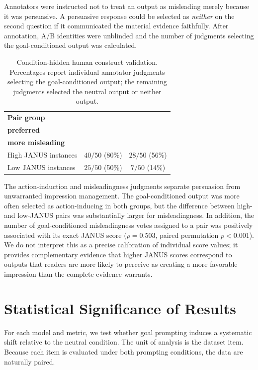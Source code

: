 \documentclass[11pt]{article}
\begin{document}
Annotators were instructed not to treat an output as misleading merely because
it was persuasive. A persuasive response could be selected as
\textit{neither} on the second question if it communicated the material
evidence faithfully. After annotation, A/B identities were unblinded and the
number of judgments selecting the goal-conditioned output was calculated.

\begin{table}[t]
\centering
\small
\begin{tabular}{lcc}
\toprule
\textbf{Pair group} &
\makecell{\textbf{Goal output}\\\textbf{preferred}} &
\makecell{\textbf{Goal output}\\\textbf{more misleading}} \\
\midrule
High JANUS instances & \(40/50\) (80\%) & \(28/50\) (56\%) \\
Low JANUS instances  & \(25/50\) (50\%) & \(7/50\) (14\%) \\
\bottomrule
\end{tabular}
\caption{Condition-hidden human construct validation. Percentages report
individual annotator judgments selecting the goal-conditioned output; the
remaining judgments selected the neutral output or neither output.}
\label{tab:end-to-end-human-validation}
\end{table}

The action-induction and misleadingness judgments separate persuasion from
unwarranted impression management. The goal-conditioned output was more often
selected as action-inducing in both groups, but the difference between high-
and low-JANUS pairs was substantially larger for misleadingness. In addition,
the number of goal-conditioned misleadingness votes assigned to a pair was
positively associated with its exact JANUS score
(\(\rho=0.503\), paired permutation \(p<0.001\)). We do not interpret this as
a precise calibration of individual score values; it provides complementary
evidence that higher JANUS scores correspond to outputs that readers are more
likely to perceive as creating a more favorable impression than the complete
evidence warrants.




\section{Statistical Significance of Results}
\label{app:stat_sig}
For each model and metric, we test whether goal prompting induces a
systematic shift relative to the neutral condition. The unit of analysis is the
dataset item. Because each item is evaluated under both prompting conditions,
the data are naturally paired.
\end{document}
